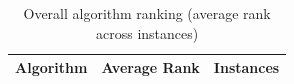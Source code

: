 \begin{table}[htbp]
\centering
\caption{Overall algorithm ranking (average rank across instances)}
\label{tab:overall_ranking}
\begin{tabular}{lrr}
\toprule
Algorithm & Average Rank & Instances \\
\midrule
\bottomrule
\end{tabular}
\end{table}
